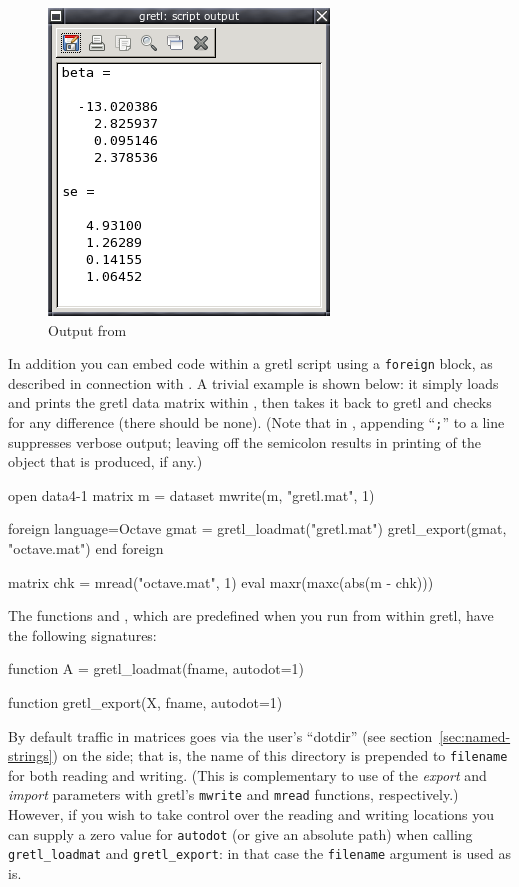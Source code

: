 \begin{figure}[htbp]
  \centering
  \includegraphics[scale=0.7]{figures/Octout}
  \caption{Output from }
  \label{fig:Octout}
\end{figure}

In addition you can embed  code within a gretl script
using a \texttt{foreign} block, as described in connection with
.  A trivial example is shown below: it simply loads and prints
the gretl data matrix within , then takes it back to gretl
and checks for any difference (there should be none). (Note that in
, appending ``\texttt{;}'' to a line suppresses verbose
output; leaving off the semicolon results in printing of the object
that is produced, if any.)
%
\begin{code}
open data4-1
matrix m = {dataset}
mwrite(m, "gretl.mat", 1)

foreign language=Octave
   gmat = gretl_loadmat("gretl.mat")
   gretl_export(gmat, "octave.mat")
end foreign

matrix chk = mread("octave.mat", 1)
eval maxr(maxc(abs(m - chk)))
\end{code}

The functions  and ,
which are predefined when you run  from within gretl, have
the following signatures:
\begin{code}
function A = gretl_loadmat(fname, autodot=1)

function gretl_export(X, fname, autodot=1)
\end{code}

By default traffic in matrices goes via the user's ``dotdir'' (see
section~\ref{sec:named-strings}) on the  side; that is,
the name of this directory is prepended to \texttt{filename} for both
reading and writing. (This is complementary to use of the
\textsl{export} and \textsl{import} parameters with gretl's
\texttt{mwrite} and \texttt{mread} functions, respectively.)  However,
if you wish to take control over the reading and writing locations you
can supply a zero value for \texttt{autodot} (or give an absolute
path) when calling \verb|gretl_loadmat| and \verb|gretl_export|: in
that case the \texttt{filename} argument is used as is.

